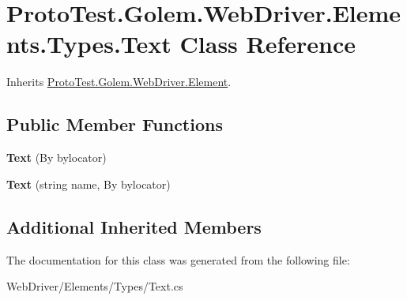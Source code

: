 \hypertarget{class_proto_test_1_1_golem_1_1_web_driver_1_1_elements_1_1_types_1_1_text}{\section{Proto\-Test.\-Golem.\-Web\-Driver.\-Elements.\-Types.\-Text Class Reference}
\label{class_proto_test_1_1_golem_1_1_web_driver_1_1_elements_1_1_types_1_1_text}
}


Inherits \hyperlink{class_proto_test_1_1_golem_1_1_web_driver_1_1_element}{Proto\-Test.\-Golem.\-Web\-Driver.\-Element}.

\subsection*{Public Member Functions}
\begin{DoxyCompactItemize}
\item 
\hypertarget{class_proto_test_1_1_golem_1_1_web_driver_1_1_elements_1_1_types_1_1_text_ab2001991c3512f0f70ad00fce8dc1ab3}{{\bfseries Text} (By bylocator)}\label{class_proto_test_1_1_golem_1_1_web_driver_1_1_elements_1_1_types_1_1_text_ab2001991c3512f0f70ad00fce8dc1ab3}

\item 
\hypertarget{class_proto_test_1_1_golem_1_1_web_driver_1_1_elements_1_1_types_1_1_text_a6f3a94d41d47ce2589e83da54833a4a0}{{\bfseries Text} (string name, By bylocator)}\label{class_proto_test_1_1_golem_1_1_web_driver_1_1_elements_1_1_types_1_1_text_a6f3a94d41d47ce2589e83da54833a4a0}

\end{DoxyCompactItemize}
\subsection*{Additional Inherited Members}


The documentation for this class was generated from the following file\-:\begin{DoxyCompactItemize}
\item 
Web\-Driver/\-Elements/\-Types/Text.\-cs\end{DoxyCompactItemize}
